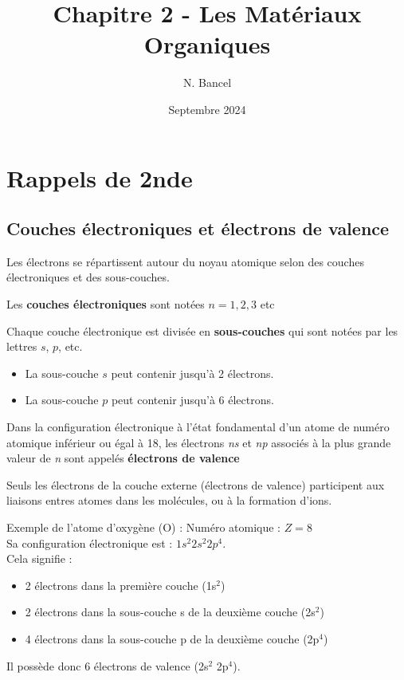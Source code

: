 \documentclass{article}
\title{Chapitre 2 - Les Matériaux Organiques}
\author{N. Bancel}
\date{Septembre 2024}
\begin{document}
\maketitle

\section{Rappels de 2nde}

\subsection{Couches électroniques et électrons de valence}

\begin{tcolorbox}[colback=green!10!white, colframe=green!75!black, title=Définitions : ]
  Les électrons se répartissent autour du noyau atomique selon des couches électroniques et des sous-couches. \par 
  \vspace{1em}
  Les \textbf{couches électroniques} sont notées \(n = 1, 2, 3\) etc \par 
  Chaque couche électronique est divisée en \textbf{sous-couches} qui sont notées par les lettres \(s\), \(p\), etc.
  \begin{itemize}[noitemsep]
    \item La sous-couche \(s\) peut contenir jusqu'à 2 électrons.
    \item La sous-couche \(p\) peut contenir jusqu'à 6 électrons.
  \end{itemize}

  Dans la configuration électronique à l'état fondamental d'un atome de numéro atomique inférieur ou égal à 18, les électrons \textit{ns} et \textit{np} associés à la plus grande valeur de \textit{n} sont appelés \textbf{électrons de valence}
  
  Seuls les électrons de la couche externe (électrons de valence) participent aux liaisons entres atomes dans les molécules, ou à la formation d’ions. 
  
\end{tcolorbox}

\begin{tcolorbox}[colback=blue!10!white, colframe=blue!75!black, title=Application : Structure électronique]
  Exemple de l'atome d'oxygène (O) : Numéro atomique : \(Z = 8\) \\
  Sa configuration électronique est : \(1s^2 2s^2 2p^4\). \\
  Cela signifie :
  \begin{itemize}[noitemsep]
    \item 2 électrons dans la première couche (1s$^2$)
    \item 2 électrons dans la sous-couche s de la deuxième couche (2s$^2$)
    \item 4 électrons dans la sous-couche p de la deuxième couche (2p$^4$)
  \end{itemize}
  Il possède donc 6 électrons de valence (2s$^2$ 2p$^4$).
\end{tcolorbox}
\end{document}
